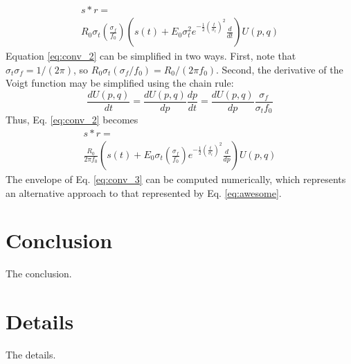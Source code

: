 \documentclass[amsmath,amssymb,aps,prd,10pt,twocolumn,showkeys]{revtex4}
\begin{document}
\begin{itemize}
\begin{multline}
s * r = \\
 R_0\sigma_t \left(\frac{\sigma_f}{f_0}\right) \left(s(t) + E_0 \sigma_t^2 e^{-\frac{1}{2}\left(\frac{t}{\sigma_t}\right)^2} \frac{d}{dt} \right) U(p,q) \label{eq:conv_2}
\end{multline}
Equation \ref{eq:conv_2} can be simplified in two ways.  First, note that $\sigma_t \sigma_f = 1/(2\pi)$, so $R_0\sigma_t (\sigma_f/f_0) = R_0/(2\pi f_0)$.  Second, the derivative of the Voigt function may be simplified using the chain rule:
\begin{equation}
\frac{dU(p,q)}{dt} = \frac{dU(p,q)}{dp}\frac{dp}{dt} = \frac{dU(p,q)}{dp} \frac{\sigma_f}{\sigma_t f_0}
\end{equation}
Thus, Eq. \ref{eq:conv_2} becomes
\begin{multline}
s * r = \\
\frac{R_0}{2\pi f_0}\left(s(t) + E_0 \sigma_t \left(\frac{\sigma_f}{f_0}\right) e^{-\frac{1}{2}\left(\frac{t}{\sigma_t}\right)^2} \frac{d}{dp}\right)U(p,q) \label{eq:conv_3}
\end{multline}
The envelope of Eq. \ref{eq:conv_3} can be computed numerically, which represents an alternative approach to that represented by Eq. \ref{eq:awesome}.
\end{itemize}

\section{Conclusion}
\label{sec:conc}

The conclusion.

\appendix

\section{Details}
\label{app:a}

The details.


\end{document}
